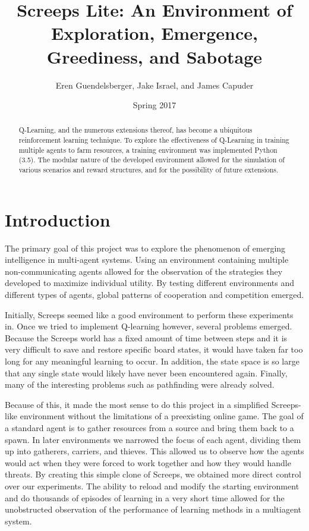 \documentclass[11pt]{article}
\title{Screeps Lite: An Environment of Exploration, Emergence, Greediness, and Sabotage}
\author{Eren Guendelsberger, Jake Israel, and James Capuder}
\date{Spring 2017}
\begin{document}
\maketitle
\thispagestyle{plain}

\begin{abstract}
Q-Learning, and the numerous extensions thereof, has become a ubiquitous reinforcement learning technique. To explore the effectiveness of Q-Learning in training multiple agents to farm resources, a training environment was implemented Python (3.5). The modular nature of the developed environment allowed for the simulation of various scenarios and reward structures, and for the possibility of future extensions.
\end{abstract}

\section{Introduction}

	The primary goal of this project was to explore the phenomenon of emerging intelligence in multi-agent systems. Using an environment containing multiple non-communicating agents allowed for the observation of the strategies they developed to maximize individual utility. By testing different environments and different types of agents, global patterns of cooperation and competition emerged. 
	
	Initially, Screeps seemed like a good environment to perform these experiments in. Once we tried to implement Q-learning however, several problems emerged. Because the Screeps world has a fixed amount of time between steps and it is very difficult to save and restore specific board states, it would have taken far too long for any meaningful learning to occur. In addition, the state space is so large that any single state would likely have never been encountered again. Finally, many of the interesting problems such as pathfinding were already solved. 
	
	Because of this, it made the most sense to do this project in a simplified Screeps-like environment without the limitations of a preexisting online game. The goal of a standard agent is to gather resources from a source and bring them back to a spawn. In later environments we narrowed the focus of each agent, dividing them up into gatherers, carriers, and thieves. This allowed us to observe how the agents would act when they were forced to work together and how they would handle threats. By creating this simple clone of Screeps, we obtained more direct control over our experiments. The ability to reload and modify the starting environment and do thousands of episodes of learning in a very short time allowed for the unobstructed observation of the performance of learning methods in a multiagent system. 
	
\end{document}
